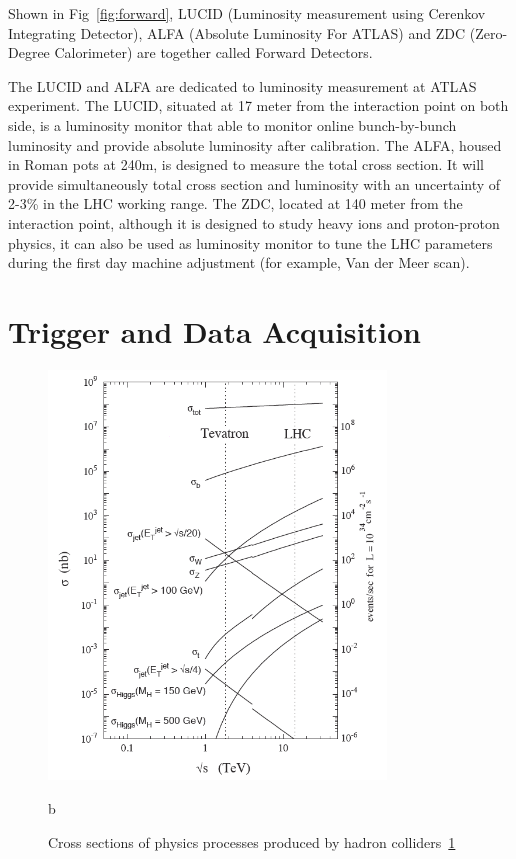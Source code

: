 \par Shown in Fig~\ref{fig:forward}, LUCID (Luminosity measurement using Cerenkov Integrating Detector), ALFA (Absolute Luminosity For ATLAS) and ZDC (Zero-Degree Calorimeter) are together called Forward Detectors. 

\par The LUCID and ALFA are dedicated to luminosity measurement at ATLAS experiment. The LUCID, situated at 17 meter from the interaction point on both side, is a luminosity monitor that able to monitor online bunch-by-bunch luminosity and provide absolute luminosity after calibration. The ALFA, housed in Roman pots at 240m, is designed to measure the total cross section. It will provide simultaneously total cross section and luminosity with an uncertainty of 2-3\% in the LHC working range. The ZDC, located at 140 meter from the interaction point, although it is designed to study heavy ions and proton-proton physics, it can also be used as luminosity monitor to tune the LHC parameters during the first day machine adjustment (for example, Van der Meer scan).

\section{Trigger and Data Acquisition}
\label{sec:data}

\begin{figure}[htbp!]
    \centering
    \includegraphics[width=0.8\textwidth]{chapters/c4/figures/cross}
    \caption{b}
    \label{fig:cross}
    \caption{Cross sections of physics processes produced by hadron colliders~\ref{fig:cross}}
\end{figure}

